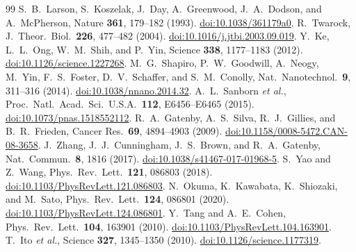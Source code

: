\documentclass[aps,prx,twocolumn,superscriptaddress,longbibliography,nofootinbib]{revtex4-2}
\begin{document}
\begin{thebibliography}{99}
S.~B.~Larson, S.~Koszelak, J.~Day, A.~Greenwood, J.~A.~Dodson, and A.~McPherson, Nature \textbf{361}, 179--182 (1993). \href{https://doi.org/10.1038/361179a0}{doi:10.1038/361179a0}.
R.~Twarock, J.\ Theor.\ Biol.\ \textbf{226}, 477--482 (2004). \href{https://doi.org/10.1016/j.jtbi.2003.09.019}{doi:10.1016/j.jtbi.2003.09.019}.
Y.~Ke, L.~L.~Ong, W.~M.~Shih, and P.~Yin, Science \textbf{338}, 1177--1183 (2012). \href{https://doi.org/10.1126/science.1227268}{doi:10.1126/science.1227268}.
M.~G.~Shapiro, P.~W.~Goodwill, A.~Neogy, M.~Yin, F.~S.~Foster, D.~V.~Schaffer, and S.~M.~Conolly, Nat.\ Nanotechnol.\ \textbf{9}, 311--316 (2014). \href{https://doi.org/10.1038/nnano.2014.32}{doi:10.1038/nnano.2014.32}.
A.~L.~Sanborn \textit{et al.}, Proc.\ Natl.\ Acad.\ Sci.\ U.S.A.\ \textbf{112}, E6456--E6465 (2015). \href{https://doi.org/10.1073/pnas.1518552112}{doi:10.1073/pnas.1518552112}.
R.~A.~Gatenby, A.~S.~Silva, R.~J.~Gillies, and B.~R.~Frieden, Cancer Res.\ \textbf{69}, 4894--4903 (2009). \href{https://doi.org/10.1158/0008-5472.CAN-08-3658}{doi:10.1158/0008-5472.CAN-08-3658}.
J.~Zhang, J.~J.~Cunningham, J.~S.~Brown, and R.~A.~Gatenby, Nat.\ Commun.\ \textbf{8}, 1816 (2017). \href{https://doi.org/10.1038/s41467-017-01968-5}{doi:10.1038/s41467-017-01968-5}.
S.~Yao and Z.~Wang, Phys.\ Rev.\ Lett.\ \textbf{121}, 086803 (2018). \href{https://doi.org/10.1103/PhysRevLett.121.086803}{doi:10.1103/PhysRevLett.121.086803}.
N.~Okuma, K.~Kawabata, K.~Shiozaki, and M.~Sato, Phys.\ Rev.\ Lett.\ \textbf{124}, 086801 (2020). \href{https://doi.org/10.1103/PhysRevLett.124.086801}{doi:10.1103/PhysRevLett.124.086801}.
Y.~Tang and A.~E.~Cohen, Phys.\ Rev.\ Lett.\ \textbf{104}, 163901 (2010). \href{https://doi.org/10.1103/PhysRevLett.104.163901}{doi:10.1103/PhysRevLett.104.163901}.
T.~Ito \textit{et al.}, Science \textbf{327}, 1345--1350 (2010). \href{https://doi.org/10.1126/science.1177319}{doi:10.1126/science.1177319}.
\end{thebibliography}
\end{document}
